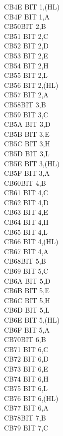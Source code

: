 \documentclass[twoside,openright,a4paper]{book}
\begin{document}
\begin{multicols}{3}
{\begin{tabbing}
	CB4E\> 	BIT 1,(HL)\\
	CB4F\> 	BIT 1,A\\
	CB50\>BIT 2,B\\
	CB51\> 	BIT 2,C\\
	CB52\> 	BIT 2,D\\
	CB53\> 	BIT 2,E\\
	CB54\> 	BIT 2,H\\
	CB55\> 	BIT 2,L\\
	CB56\> 	BIT 2,(HL)\\
	CB57\> 	BIT 2,A\\
	CB58\>BIT 3,B\\
	CB59\> 	BIT 3,C\\
	CB5A\> 	BIT 3,D\\
	CB5B\> 	BIT 3,E\\
	CB5C\> 	BIT 3,H\\
	CB5D\> 	BIT 3,L\\
	CB5E\> 	BIT 3,(HL)\\
	CB5F\> 	BIT 3,A\\
	CB60\>BIT 4,B\\
	CB61\> 	BIT 4,C\\
	CB62\> 	BIT 4,D\\
	CB63\> 	BIT 4,E\\
	CB64\> 	BIT 4,H\\
	CB65\> 	BIT 4,L\\
	CB66\> 	BIT 4,(HL)\\
	CB67\> 	BIT 4,A\\
	CB68\>BIT 5,B\\
	CB69\> 	BIT 5,C\\
	CB6A\> 	BIT 5,D\\
	CB6B\> 	BIT 5,E\\
	CB6C\> 	BIT 5,H\\
	CB6D\> 	BIT 5,L\\
	CB6E\> 	BIT 5,(HL)\\
	CB6F\> 	BIT 5,A\\
	CB70\>BIT 6,B\\
	CB71\> 	BIT 6,C\\
	CB72\> 	BIT 6,D\\
	CB73\> 	BIT 6,E\\
	CB74\> 	BIT 6,H\\
	CB75\> 	BIT 6,L\\
	CB76\> 	BIT 6,(HL)\\
	CB77\> 	BIT 6,A\\
	CB78\>BIT 7,B\\
	CB79\> 	BIT 7,C\\

\end{tabbing}}
\end{multicols}
\end{document}
